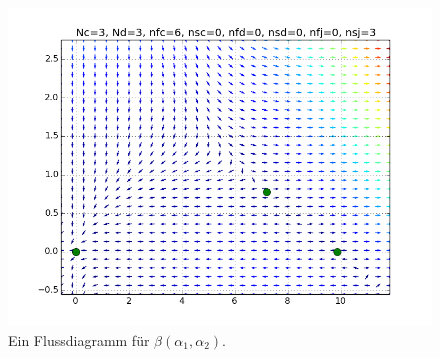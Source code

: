   \begin{figure}[h]
    \centering
    \includegraphics[scale=0.5]{abschnitte/beta_im_R2/fig/flow_example.png}
    \caption{Ein Flussdiagramm für $\beta(\alpha_1,\alpha_2 )$.}
    \label{beta_allgemein:fig:fluss_beispiel}
   \end{figure}
